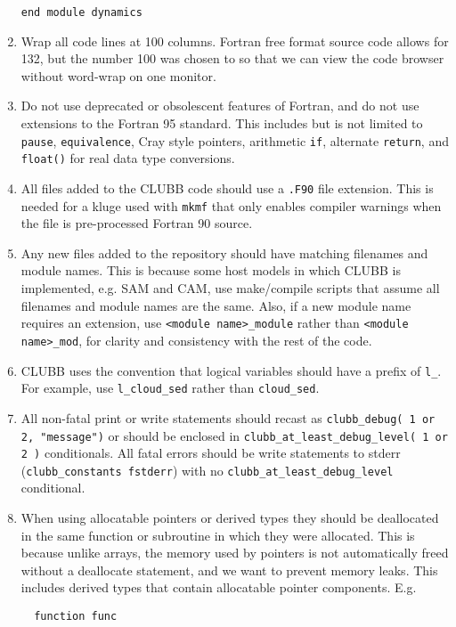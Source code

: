 \documentclass[letterpaper,12pt]{article}
\begin{document}
\begin{enumerate}
\verb|end module dynamics|

\item Wrap all code lines at 100 columns.  Fortran free format source code
allows for 132, but the number 100 was chosen to so that we can view the code 
browser without word-wrap on one monitor.

\item Do not use deprecated or obsolescent features of Fortran, and do not
use extensions to the Fortran 95 standard.  This includes but is not limited to
\texttt{pause}, \texttt{equivalence}, Cray style pointers, 
arithmetic \texttt{if}, alternate \texttt{return}, and \texttt{float()} for 
real data type conversions.

\item All files added to the CLUBB code should use a \texttt{.F90} file 
extension.  This is needed for a kluge used with \texttt{mkmf} that only enables
compiler warnings when the file is pre-processed Fortran 90 source. 

\item Any new files added to the repository should have matching filenames and module names. 
This is because some host models in which CLUBB is implemented, e.g. SAM and CAM, use 
make/compile scripts that assume all filenames and module names are the same.
Also, if a new module name requires an extension, use \verb|<module name>_module|
rather than \verb|<module name>_mod|, for clarity and consistency with the rest of the code. 

\item CLUBB uses the convention that logical variables should have a prefix of \verb|l_|.  For example,
use \verb|l_cloud_sed| rather than \verb|cloud_sed|.

\item All non-fatal print or write statements should recast as \verb|clubb_debug( 1 or 2, "message")| or
should be enclosed in \verb|clubb_at_least_debug_level( 1 or 2 )| conditionals. All fatal errors should
be write statements to stderr (\verb|clubb_constants fstderr|) with no \verb|clubb_at_least_debug_level| conditional.

\item When using allocatable pointers or derived types they should be deallocated in the same function or subroutine 
in which they were allocated.  This is because unlike arrays, the memory used by pointers is not 
automatically freed without a deallocate statement, and we want to prevent memory leaks. This includes 
derived types that contain allocatable pointer components. E.g. \\
\begin{verbatim}
  function func


\end{verbatim}
\end{enumerate}
\end{document}

